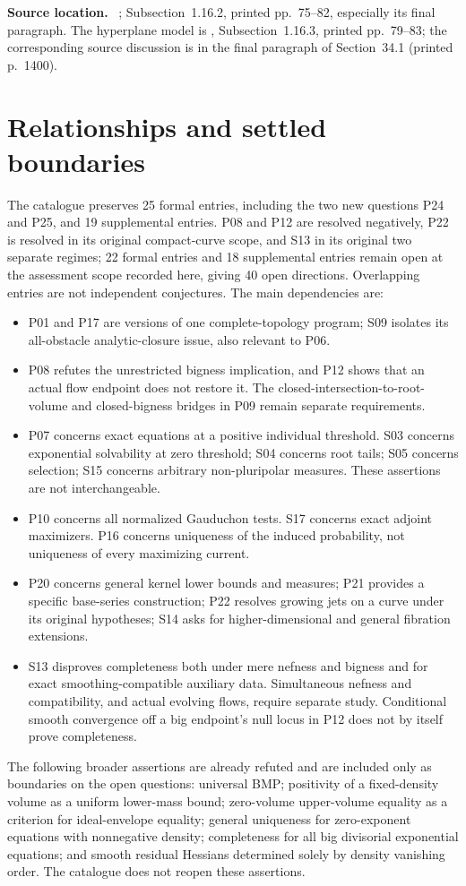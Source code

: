 \documentclass[11pt]{article}
\newcommand{\field}[1]{\par\medskip\noindent\textbf{#1.}\ }
\begin{document}
\field{Source location} ; Subsection~1.16.2, printed pp.~75--82, especially its final paragraph. The hyperplane model is , Subsection~1.16.3, printed pp.~79--83; the corresponding source discussion is in the final paragraph of Section~34.1 (printed p.~1400).

\section{Relationships and settled boundaries}
The catalogue preserves 25 formal entries, including the two new questions P24 and P25, and 19 supplemental entries. P08 and P12 are resolved negatively, P22 is resolved in its original compact-curve scope, and S13 in its original two separate regimes; 22 formal entries and 18 supplemental entries remain open at the assessment scope recorded here, giving 40 open directions. Overlapping entries are not independent conjectures. The main dependencies are:
\begin{itemize}
\item P01 and P17 are versions of one complete-topology program; S09 isolates its all-obstacle analytic-closure issue, also relevant to P06.
\item P08 refutes the unrestricted bigness implication, and P12 shows that an actual flow endpoint does not restore it. The closed-intersection-to-root-volume and closed-bigness bridges in P09 remain separate requirements.
\item P07 concerns exact equations at a positive individual threshold. S03 concerns exponential solvability at zero threshold; S04 concerns root tails; S05 concerns selection; S15 concerns arbitrary non-pluripolar measures. These assertions are not interchangeable.
\item P10 concerns all normalized Gauduchon tests. S17 concerns exact adjoint maximizers. P16 concerns uniqueness of the induced probability, not uniqueness of every maximizing current.
\item P20 concerns general kernel lower bounds and measures; P21 provides a specific base-series construction; P22 resolves growing jets on a curve under its original hypotheses; S14 asks for higher-dimensional and general fibration extensions.
\item S13 disproves completeness both under mere nefness and bigness and for exact smoothing-compatible auxiliary data. Simultaneous nefness and compatibility, and actual evolving flows, require separate study. Conditional smooth convergence off a big endpoint's null locus in P12 does not by itself prove completeness.
\end{itemize}
The following broader assertions are already refuted and are included only as boundaries on the open questions: universal BMP; positivity of a fixed-density volume as a uniform lower-mass bound; zero-volume upper-volume equality as a criterion for ideal-envelope equality; general uniqueness for zero-exponent equations with nonnegative density; completeness for all big divisorial exponential equations; and smooth residual Hessians determined solely by density vanishing order. The catalogue does not reopen these assertions.
\end{document}
